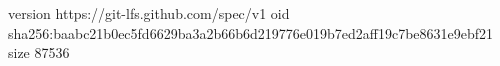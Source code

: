 version https://git-lfs.github.com/spec/v1
oid sha256:baabc21b0ec5fd6629ba3a2b66b6d219776e019b7ed2aff19c7be8631e9ebf21
size 87536
